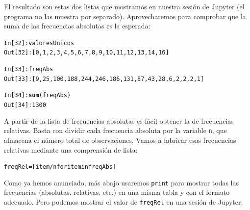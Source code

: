 \documentclass[10pt,a4paper]{article}\usepackage[]{graphicx}\usepackage[]{color}
\makeatletter
\newcommand{\hlkwd}[1]{\textcolor[rgb]{0.737,0.353,0.396}{\textbf{#1}}}%
\newenvironment{kframe}{%
 \def\at@end@of@kframe{}%
 \ifinner\ifhmode%
  \def\at@end@of@kframe{\end{minipage}}%
  \begin{minipage}{\columnwidth}%
 \fi\fi%
 \def\FrameCommand##1{\hskip\@totalleftmargin \hskip-\fboxsep
 \colorbox{shadecolor}{##1}\hskip-\fboxsep
     \hskip-\linewidth \hskip-\@totalleftmargin \hskip\columnwidth}%
 \MakeFramed {\advance\hsize-\width
   \@totalleftmargin\z@ \linewidth\hsize
   \@setminipage}}%
 {\par\unskip\endMakeFramed%
 \at@end@of@kframe}
\newenvironment{knitrout}{}{} %
\makeatother
\begin{document}
El resultado son estas dos listas que mostramos en nuestra sesión de Jupyter (el programa no las muestra por separado). Aprovecharemos para comprobar que la suma de las frecuencias absolutas es la esperada:
\begin{knitrout}
\color{fgcolor}\begin{kframe}
\begin{alltt}
In [32]: valoresUnicos
Out[32]: [0, 1, 2, 3, 4, 5, 6, 7, 8, 9, 10, 11, 12, 13, 14, 16]

In [33]: freqAbs
Out[33]: [9, 25, 100, 188, 244, 246, 186, 131, 87, 43, 28, 6, 2, 2, 2, 1]

In [34]: \hlkwd{sum}(freqAbs)
Out[34]: 1300
\end{alltt}
\end{kframe}
\end{knitrout}
A partir de la lista de frecuencias absolutas es fácil obtener la de frecuencias relativas. Basta con dividir cada frecuencia absoluta por la variable {\tt n}, que almacena el número total de observaciones. Vamos a fabricar esas frecuencias relativas mediante una comprensión de lista:

\begin{knitrout}
\color{fgcolor}\begin{kframe}
\begin{alltt}
freqRel = [ item/n for item in freqAbs]
\end{alltt}
\end{kframe}
\end{knitrout}
Como ya hemos anunciado, más abajo usaremos {\tt print} para mostrar todas las frecuencias (absolutas, relativas, etc.) en una misma tabla y con el formato adecuado. Pero podemos mostrar el valor de {\tt freqRel} en una sesión de Jupyter:
\end{document}
